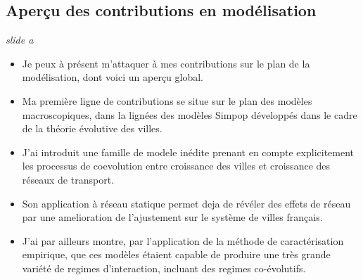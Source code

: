 \documentclass[12pt]{article}
\begin{document}


\newpage


\subsection*{Aperçu des contributions en modélisation}

\textit{slide a}

\begin{itemize}
	\item Je peux à présent m'attaquer à mes contributions sur le plan de la modélisation, dont voici un aperçu global.
	\item Ma première ligne de contributions se situe sur le plan des modèles macroscopiques, dans la lignées des modèles Simpop développés dans le cadre de la théorie évolutive des villes.
	\item J'ai introduit une famille de modele inédite prenant en compte explicitement les processus de coevolution entre croissance des villes et croissance des réseaux de transport.
	\item Son application à réseau statique permet deja de révéler des effets de réseau par une amelioration de l'ajustement sur le système de villes français.
	\item J'ai par ailleurs montre, par l'application de la méthode de caractérisation empirique, que ces modèles étaient capable de produire une très grande variété de regimes d'interaction, incluant des regimes co-évolutifs.
\end{itemize}


\end{document}

